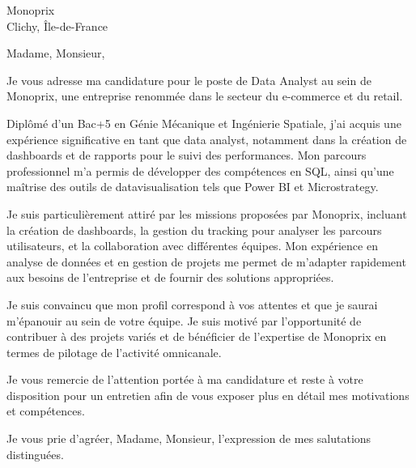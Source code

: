 \documentclass[a4paper,10pt]{letter}
\begin{document}
\begin{letter}{Monoprix\\ Clichy, Île-de-France}

\opening{Madame, Monsieur,}

Je vous adresse ma candidature pour le poste de Data Analyst au sein de Monoprix, une entreprise renommée dans le secteur du e-commerce et du retail. 

Diplômé d'un Bac+5 en Génie Mécanique et Ingénierie Spatiale, j'ai acquis une expérience significative en tant que data analyst, notamment dans la création de dashboards et de rapports pour le suivi des performances. Mon parcours professionnel m'a permis de développer des compétences en SQL, ainsi qu'une maîtrise des outils de datavisualisation tels que Power BI et Microstrategy.

Je suis particulièrement attiré par les missions proposées par Monoprix, incluant la création de dashboards, la gestion du tracking pour analyser les parcours utilisateurs, et la collaboration avec différentes équipes. Mon expérience en analyse de données et en gestion de projets me permet de m'adapter rapidement aux besoins de l'entreprise et de fournir des solutions appropriées.

Je suis convaincu que mon profil correspond à vos attentes et que je saurai m'épanouir au sein de votre équipe. Je suis motivé par l'opportunité de contribuer à des projets variés et de bénéficier de l'expertise de Monoprix en termes de pilotage de l'activité omnicanale.

Je vous remercie de l'attention portée à ma candidature et reste à votre disposition pour un entretien afin de vous exposer plus en détail mes motivations et compétences.

\closing{Je vous prie d'agréer, Madame, Monsieur, l'expression de mes salutations distinguées.}

\signature{Pietro Gazzi}

\end{letter}
\end{document}
